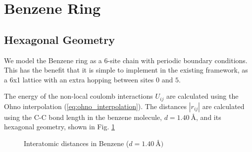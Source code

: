 \section{Benzene Ring}






\subsection{Hexagonal Geometry}

We model the Benzene ring as a 6-site chain with periodic boundary conditions. This has the benefit that it is simple to implement in the existing framework, as a 6x1 lattice with an extra hopping between sites $0$ and $5$. 


\medskip

The energy of the non-local coulomb interactions $U_{ij}$ are calculated using the Ohno interpolation (\ref{eq:ohno_interpolation}). The distances $|r_{ij}|$ are calculated using the C-C bond length in the benzene molecule, $d=\SI{1.40}{\angstrom}$, and its hexagonal geometry, shown in Fig. \ref{fig:benzene_distances}

\begin{figure}[!hbt]
    \centering
    \caption{Interatomic distances in Benzene ($d=\SI{1.40}{\angstrom})$}
    \label{fig:benzene_distances}
\end{figure}

